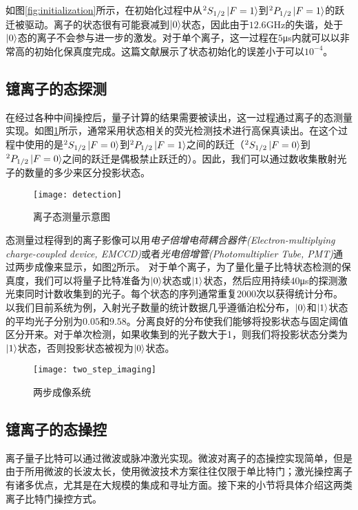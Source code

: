 如图\ref{fig:initialization}所示，在初始化过程中从$^2S_{1/2}\ket{F=1}$到$^2P_{1/2}\ket{F=1}$的跃迁被驱动。离子的状态很有可能衰减到$\ket{0}$状态，因此由于$12.6$GHz的失谐，处于$\ket{0}$态的离子不会参与进一步的激发。对于单个离子，这一过程在$5$μs内就可以以非常高的初始化保真度完成。这篇\cite[]{Harty_Allcock_Ballance_Guidoni_Janacek_Linke_Stacey_Lucas_2014}文献展示了状态初始化的误差小于可以$10^{−4}$。

\subsection[镱离子的态探测]{镱离子的态探测\label{section:yb_state_detection}}
在经过各种中间操控后，量子计算的结果需要被读出，这一过程通过离子的态测量实现。如图\ref{fig:detection}所示，通常采用状态相关的荧光检测技术进行高保真读出\cite[]{Blinov_Leibfried_Monroe_Wineland_2004}。在这个过程中使用的是$^2S_{1/2}\ket{F=0}$到$^2P_{1/2}\ket{F=1}$之间的跃迁（$^2S_{1/2}\ket{F=0}$到$^2P_{1/2}\ket{F=0}$之间的跃迁是偶极禁止跃迁的）。因此，我们可以通过数收集散射光子的数量的多少来区分投影状态。
\begin{figure}
    \centering
    \caption[离子态测量示意图]{离子态测量示意图\label{fig:detection}}
    \texttt{[image: detection]}
\end{figure}

态测量过程得到的离子影像可以用\emph{电子倍增电荷耦合器件(Electron-multiplying charge-coupled device, EMCCD)}或者\emph{光电倍增管(Photomultiplier Tube, PMT)}通过两步成像来显示，如图\ref{fig:two_step_imaging}所示。
对于单个离子，为了量化量子比特状态检测的保真度，我们可以将量子比特准备为$\ket{0}$状态或$\ket{1}$状态，然后应用持续$40$μs的探测激光束同时计数收集到的光子。每个状态的序列通常重复$2000$次以获得统计分布。
以我们目前系统为例，入射光子数量的统计数据几乎遵循泊松分布，$\ket{0}$和$\ket{1}$状态的平均光子分别为$0.05$和$9.58$。分离良好的分布使我们能够将投影状态与固定阈值区分开来。对于单次检测，如果收集到的光子数大于1，则我们将投影状态分类为$\ket{1}$状态，否则投影状态被视为$\ket{0}$状态。

\begin{figure}
    \centering
    \caption[两步成像系统]{两步成像系统\label{fig:two_step_imaging}}
    \texttt{[image: two\_step\_imaging]}
\end{figure}



\subsection[镱离子的态操控]{镱离子的态操控\label{section:yb_state_manipulation}}
离子量子比特可以通过微波\cite[]{Olmschenk_Younge_Moehring_Matsukevich_Maunz_Monroe_2007}或脉冲激光\cite[]{Lee_2005}实现。微波对离子的态操控实现简单，但是由于所用微波的长波太长，使用微波技术方案往往仅限于单比特门；激光操控离子有诸多优点，尤其是在大规模的集成和寻址方面。接下来的小节将具体介绍这两类离子比特门操控方式。
